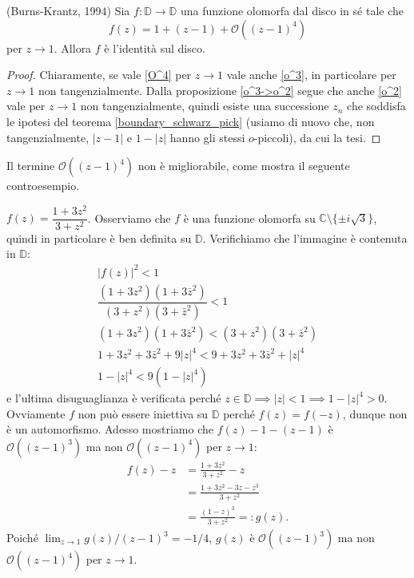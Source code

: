\begin{thm} \label{burns_krantz}
  (Burns-Krantz, 1994) Sia $f:\mathbb{D} \longrightarrow \mathbb{D}$ una funzione olomorfa dal disco in sé tale che
  \begin{equation} \label{O^4}
    f(z)=1+(z-1)+\mathcal{O}((z-1)^4)
  \end{equation}
  per $z \longrightarrow 1$. Allora $f$ è l'identità sul disco.
\end{thm}

\begin{proof}

  Chiaramente, se vale \eqref{O^4} per $z \longrightarrow 1$ vale anche \eqref{o^3}, in particolare per $z \longrightarrow 1$ non tangenzialmente.
  Dalla proposizione \ref{o^3->o^2} segue che anche \eqref{o^2} vale per $z \longrightarrow 1$ non tangenzialmente, quindi esiste una successione $z_n$ che soddisfa le ipotesi del teorema \ref{boundary_schwarz_pick} (usiamo di nuovo che, non tangenzialmente, $|z-1|$ e $1-|z|$ hanno gli stessi $o$-piccoli), da cui la tesi.
\end{proof}

Il termine $\mathcal{O}((z-1)^4)$ non è migliorabile, come mostra il seguente controesempio.

\begin{ex}
  $f(z)=\dfrac{1+3z^2}{3+z^2}$. Osserviamo che $f$ è una funzione olomorfa su $\mathbb{C} \setminus \{\pm i\sqrt{3}\}$, quindi in particolare è ben definita su $\mathbb{D}$. Verifichiamo che l'immagine è contenuta in $\mathbb{D}$:
  \begin{align*}
    |f(z)|^2<1 \\
    \dfrac{(1+3z^2)(1+3\bar{z}^2)}{(3+z^2)(3+\bar{z}^2)} < 1 \\
    (1+3z^2)(1+3\bar{z}^2) < (3+z^2)(3+\bar{z}^2) \\
    1+3z^2+3\bar{z}^2+9|z|^4 < 9+3z^2+3\bar{z}^2+|z|^4 \\
    1-|z|^4 < 9(1-|z|^4)
  \end{align*}
  e l'ultima disuguaglianza è verificata perché $z \in \mathbb{D} \implies |z|<1 \implies 1-|z|^4>0$. \\
  Ovviamente $f$ non può essere iniettiva su $\mathbb{D}$ perché $f(z)=f(-z)$, dunque non è un automorfismo. Adesso mostriamo che $f(z)-1-(z-1)$ è $\mathcal{O}((z-1)^3)$ ma non $\mathcal{O}((z-1)^4)$ per $z \longrightarrow 1$:
  \begin{align*}
    f(z)-z & =\frac{1+3z^2}{3+z^2}-z \\
    & =\frac{1+3z^2-3z-z^3}{3+z^2} \\
    & =\frac{(1-z)^3}{3+z^2}=:g(z).
  \end{align*}
  Poiché $\displaystyle \lim_{z \longrightarrow 1} g(z)/(z-1)^3=-1/4$, $g(z)$ è $\mathcal{O}((z-1)^3)$ ma non $\mathcal{O}((z-1)^4)$ per $z \longrightarrow 1$.
\end{ex}
